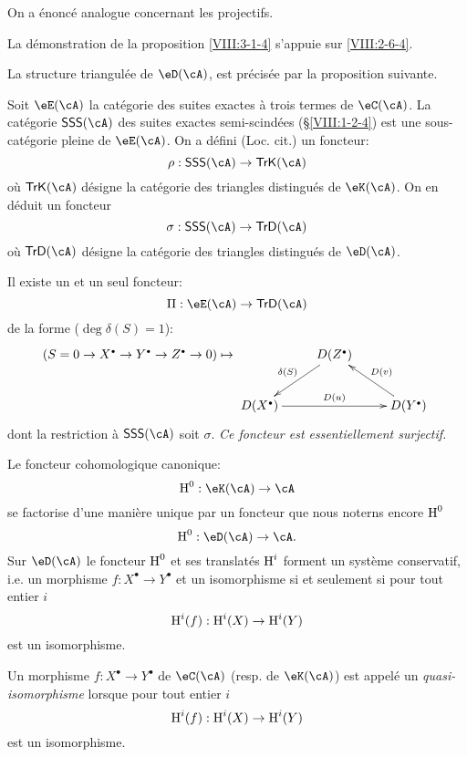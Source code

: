 On a énoncé analogue concernant les projectifs. 

La démonstration de la proposition \ref{VIII:3-1-4} s'appuie sur 
\ref{VIII:2-6-4}. 

La structure triangulée de $\eD(\cA)$, est précisée par la proposition 
suivante. 

Soit $\eE(\cA)$ la catégorie des suites exactes à trois termes de 
$\eC(\cA)$. La catégorie $\mathsf{SSS}(\cA)$ des suites exactes 
semi-scindées (\S\ref{VIII:1-2-4}) est une sous-catégorie pleine de 
$\eE(\cA)$. On a défini (Loc. cit.) un foncteur: 
\[
  \rho:\mathsf{SSS}(\cA) \to \mathsf{TrK}(\cA) 
\]
où $\mathsf{TrK}(\cA)$ désigne la catégorie des triangles distingués 
de $\eK(\cA)$. On en déduit un foncteur 
\[
  \sigma : \mathsf{SSS}(\cA) \to \mathsf{TrD}(\cA) 
\]
où $\mathsf{TrD}(\cA)$ désigne la catégorie des triangles distingués 
de $\eD(\cA)$. 





\begin{proposition}\label{VIII:3-1-5}
Il existe un et un seul foncteur: 
\[
  \Pi:\eE(\cA) \to \mathsf{TrD}(\cA) 
\]
de la forme ($\deg \delta(S)=1$): 
\[
(S=0 \to X^\bullet \to Y^\bullet \to Z^\bullet \to 0) 
\mapsto 
\xymatrix{
  & D(Z^\bullet) \ar[dl]_-{\delta(S)} \\
  D(X^\bullet) \ar[rr]^-{D(u)} 
    & & D(Y^\bullet) \ar[ul]_-{D(v)} 
}
\]
dont la restriction à $\mathsf{SSS}(\cA)$ soit $\sigma$. \emph{Ce foncteur 
est essentiellement surjectif.}
\end{proposition}





\begin{proposition}\label{VIII:3-1-6}
Le foncteur cohomologique canonique: 
\[
  \h^0:\eK(\cA) \to \cA 
\]
se factorise d'une manière unique par un foncteur que nous noterns encore 
$\operatorname{H}^0$ 
\[
  \h^0:\eD(\cA) \to \cA \text{.}
\]
Sur $\eD(\cA)$ le foncteur $\operatorname{H}^0$ et ses translatés $\operatorname{H}^i$ forment un 
système conservatif, i.e. un morphisme $f:X^\bullet \to Y^\bullet$ et un 
isomorphisme si et seulement si pour tout entier $i$ 
\[
  \operatorname{H}^i(f):\operatorname{H}^i(X) \to \operatorname{H}^i(Y) 
\]
est un isomorphisme. 
\end{proposition}





\begin{definition}\label{VIII:3-1-7}
Un morphisme $f:X^\bullet \to Y^\bullet$ de $\eC(\cA)$ (resp. de $\eK(\cA)$) 
est appelé un \emph{quasi-isomorphisme} lorsque pour tout entier $i$ 
\[
  \operatorname{H}^i(f):\operatorname{H}^i(X) \to \operatorname{H}^i(Y) 
\]
est un isomorphisme. 
\end{definition}

